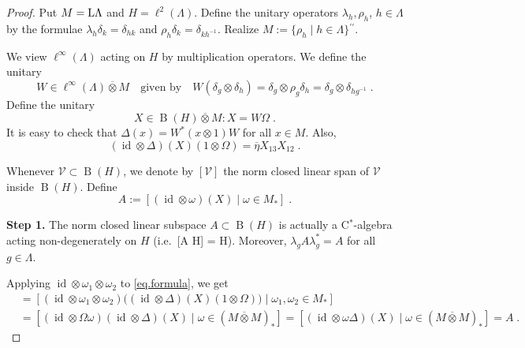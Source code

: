 \documentclass[a4paper,11pt]{amsart}
\numberwithin{equation}{section}
\begin{document}
\begin{proof}
Put $M = {\mathord{\text{\rm L}}} \Lambda$ and $H = \ell^2(\Lambda)$. Define the unitary operators $\lambda_h, \rho_h$, $h \in \Lambda$ by the formulae $\lambda_h \delta_k = \delta_{hk}$ and $\rho_h \delta_k = \delta_{kh^{-1}}$. Realize $M := \{\rho_h \mid h \in \Lambda\}{^{\prime\prime}}$.

We view $\ell^\infty(\Lambda)$ acting on $H$ by multiplication operators. We define the unitary
$$W \in \ell^\infty(\Lambda) {\mathbin{\overline{\otimes}}} M \quad\text{given by}\quad W(\delta_g {\otimes} \delta_h) = \delta_g {\otimes} \rho_g \delta_h = \delta_g {\otimes} \delta_{hg^{-1}} \; .$$
Define the unitary
$$X \in {\operatorname{B}}(H) {\mathbin{\overline{\otimes}}} M : X = W \Omega \; .$$
It is easy to check that ${\Delta}(x) = W^*(x {\otimes} 1) W$ for all $x \in M$. Also,
\begin{equation}\label{eq.formula}
({\mathord{\operatorname{id}}} {\otimes} {\Delta})(X) (1 {\otimes} {\Omega}) = \overline{\eta} X_{13} X_{12} \; .
\end{equation}

Whenever ${\mathcal{V}} \subset {\operatorname{B}}(H)$, we denote by $[{\mathcal{V}}]$ the norm closed linear span of ${\mathcal{V}}$ inside ${\operatorname{B}}(H)$. Define
$$A := [ ({\mathord{\operatorname{id}}} {\otimes} {\omega})(X) \mid {\omega} \in M_* ] \; .$$

{\bf Step 1.} The norm closed linear subspace $A \subset {\operatorname{B}}(H)$ is actually a C$^*$-algebra acting non-degenerately on $H$ (i.e.\ [A H] = H). Moreover, $\lambda_g A \lambda_g^* = A$ for all $g \in \Lambda$.

Applying ${\mathord{\operatorname{id}}} {\otimes} {\omega}_1 {\otimes} {\omega}_2$ to \eqref{eq.formula}, we get
\begin{align*}
[A A] &= [({\mathord{\operatorname{id}}} {\otimes} {\omega}_1 {\otimes} {\omega}_2)\bigl( ({\mathord{\operatorname{id}}} {\otimes} {\Delta})(X) (1 {\otimes} {\Omega}) \bigr) \mid {\omega}_1,{\omega}_2 \in M_* ] \\ &= [({\mathord{\operatorname{id}}} {\otimes} {\Omega} {\omega})({\mathord{\operatorname{id}}} {\otimes} {\Delta})(X) \mid {\omega} \in (M {\mathbin{\overline{\otimes}}} M)_* ] = [({\mathord{\operatorname{id}}} {\otimes} {\omega}{\Delta})(X) \mid {\omega} \in (M {\mathbin{\overline{\otimes}}} M)_* ] = A \; .
\end{align*}


\end{proof}
\end{document}
